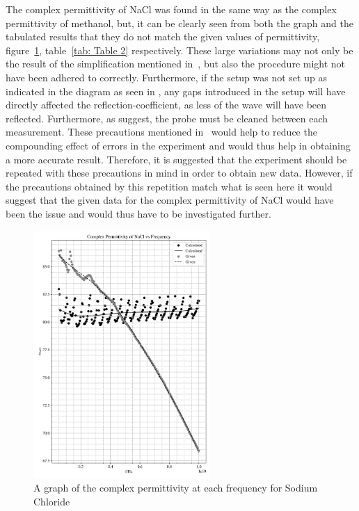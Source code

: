 \documentclass[12pt, a4paper]{article}
\begin{document}
The complex permittivity of NaCl was found in the same way as the complex permittivity of methanol, but, it can be clearly seen from both the graph and the tabulated results that they do not match the given values of permittivity, figure~\ref{fig: NaCl Graph}, table~\ref{tab: Table 2} respectively. These large variations may not only be the result of the simplification mentioned in~\cite{marsland1987dielectric}, but also the procedure might not have been adhered to correctly. Furthermore, if the setup was not set up as indicated in the diagram as seen in \cite{marsland1987dielectric}, any gaps introduced in the setup will have directly affected the reflection-coefficient, as less of the wave will have been reflected. Furthermore, as \cite{marsland1987dielectric} suggest, the probe must be cleaned between each measurement. These precautions mentioned in~\cite{marsland1987dielectric} would help to reduce the compounding effect of errors in the experiment and would thus help in obtaining a more accurate result. Therefore, it is suggested that the experiment should be repeated with these precautions in mind in order to obtain new data. However, if the precautions obtained by this repetition match what is seen here it would suggest that the given data for the complex permittivity of NaCl would have been the issue and would thus have to be investigated further.

\begin{figure}[H]
    \centering
    \includegraphics[width = 0.6\textwidth]{Plot2.png}\caption{A graph of the complex permittivity at each frequency for Sodium Chloride}\label{fig: NaCl Graph}
\end{figure}
\end{document}
